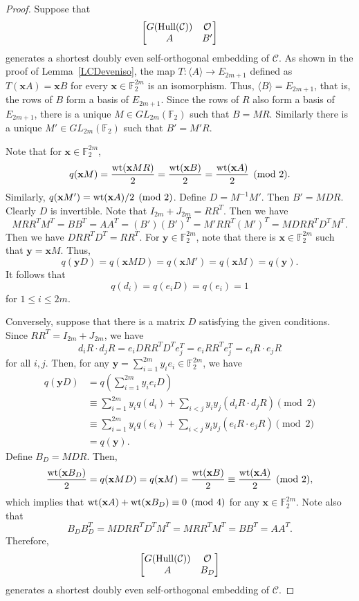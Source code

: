 \documentclass{article}
\theoremstyle{definition}
\theoremstyle{remark}
\begin{document}
\begin{proof}
    Suppose that
    \[
    \begin{bmatrix}
       G({\rm Hull}(\mathcal{C})) & \mathcal{O}\\A & B'
    \end{bmatrix}
    \]
    generates a shortest doubly even self-orthogonal embedding of $\mathcal{C}$. As shown in the proof of Lemma~\ref{LCDeveniso}, the map $T:\langle A\rangle \to E_{2m+1}$ defined as $T(\mathbf{x}A)=\mathbf{x}B$ for every $\mathbf{x}\in\mathbb{F}_2^{2m}$ is an isomorphism. Thus, $\langle B\rangle=E_{2m+1}$, that is, the rows of $B$ form a basis of $E_{2m+1}$. Since the rows of $R$ also form a basis of $E_{2m+1}$, there is a unique $M\in GL_{2m}(\mathbb{F}_2)$ such that $B=MR$. Similarly there is a unique $M'\in GL_{2m}(\mathbb{F}_2)$ such that $B'=M'R$.

    Note that for $\mathbf{x}\in\mathbb{F}_2^{2m}$, 
    \[
    q(\mathbf{x}M)=\frac{{\rm wt}(\mathbf{x}MR)}{2}=\frac{{\rm wt}(\mathbf{x}B)}{2}=\frac{{\rm wt}(\mathbf{x}A)}{2}\pmod 2.
    \]
    Similarly, $q(\mathbf{x}M')={\rm wt}(\mathbf{x}A)/2\pmod 2$. Define $D=M^{-1}M'$. Then $B'=MDR$. Clearly $D$ is invertible. Note that $I_{2m}+J_{2m}=RR^T$. Then we have
    \[
    MRR^TM^T=BB^T=AA^T=(B')(B')^T=M'RR^T(M')^T=MDRR^TD^TM^T.
    \]
    Then we have $DRR^TD^T=RR^T$. For $\mathbf{y}\in\mathbb{F}_2^{2m}$, note that there is $\mathbf{x}\in\mathbb{F}_2^{2m}$ such that $\mathbf{y}=\mathbf{x}M$. Thus,
    \[
    q(\mathbf{y}D)=q(\mathbf{x}MD)=q(\mathbf{x}M')=q(\mathbf{x}M)=q(\mathbf{y}).
    \]
    It follows that
    \[
    q(d_i)=q(e_iD)=q(e_i)=1
    \]
    for $1\le i\le 2m$.

    Conversely, suppose that there is a matrix $D$ satisfying the given conditions. Since $RR^T=I_{2m}+J_{2m}$, we have
    \[
    d_iR\cdot d_jR=e_iDRR^TD^Te_j^T=e_iRR^Te_j^T=e_iR\cdot e_jR
    \]
    for all $i, j$. Then, for any $\mathbf{y}=\sum_{i=1}^{2m}y_ie_i\in\mathbb{F}_2^{2m}$, we have
    \begin{align*}
    q(\mathbf{y}D)&=q\left(\sum_{i=1}^{2m}y_ie_iD\right)\\&\equiv\sum_{i=1}^{2m}y_iq(d_i)+\sum_{i<j}y_iy_j(d_iR\cdot d_jR)\pmod 2\\&\equiv\sum_{i=1}^{2m}y_iq(e_i)+\sum_{i<j}y_iy_j(e_iR\cdot e_jR)\pmod 2\\&=q(\mathbf{y}).
    \end{align*}
    Define $B_D=MDR$. Then,
   \[
   \frac{{\rm wt}(\mathbf{x}B_D)}{2}=q(\mathbf{x}MD)=q(\mathbf{x}M)=\frac{{\rm wt}(\mathbf{x}B)}{2}\equiv \frac{{\rm wt}(\mathbf{x}A)}{2}\pmod 2,
   \]
   which implies that ${\rm wt}(\mathbf{x}A)+{\rm wt}(\mathbf{x}B_D)\equiv 0\pmod 4$ for any $\mathbf{x}\in\mathbb{F}_2^{2m}$. Note also that
   \[
   B_DB_D^T=MDRR^TD^TM^T=MRR^TM^T=BB^T=AA^T.
   \]
   Therefore,
   \[
    \begin{bmatrix}
    G({\rm Hull}(\mathcal{C})) & \mathcal{O}\\A & B_D
    \end{bmatrix}
    \]
    generates a shortest doubly even self-orthogonal embedding of $\mathcal{C}$.
\end{proof}
\end{document}
